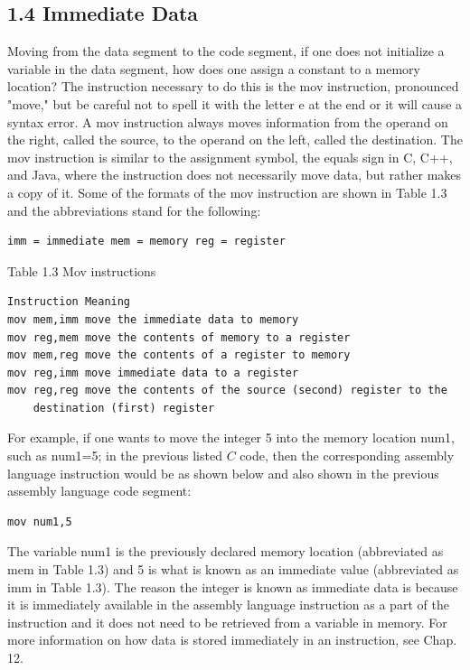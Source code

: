 \documentclass[10pt]{book}
\begin{document}
\subsection*{1.4 Immediate Data}
Moving from the data segment to the code segment, if one does not initialize a variable in the data segment, how does one assign a constant to a memory location? The instruction necessary to do this is the mov instruction, pronounced "move," but be careful not to spell it with the letter e at the end or it will cause a syntax error. A mov instruction always moves information from the operand on the right, called the source, to the operand on the left, called the destination. The mov instruction is similar to the assignment symbol, the equals sign in C, C++, and Java, where the instruction does not necessarily move data, but rather makes a copy of it. Some of the formats of the mov instruction are shown in Table 1.3 and the abbreviations stand for the following:

\begin{verbatim}
imm = immediate mem = memory reg = register
\end{verbatim}

Table 1.3 Mov instructions

\begin{verbatim}
Instruction Meaning
mov mem,imm move the immediate data to memory
mov reg,mem move the contents of memory to a register
mov mem,reg move the contents of a register to memory
mov reg,imm move immediate data to a register
mov reg,reg move the contents of the source (second) register to the
    destination (first) register
\end{verbatim}

For example, if one wants to move the integer 5 into the memory location num1, such as num1=5; in the previous listed $C$ code, then the corresponding assembly language instruction would be as shown below and also shown in the previous assembly language code segment:

\begin{verbatim}
mov num1,5
\end{verbatim}

The variable num1 is the previously declared memory location (abbreviated as mem in Table 1.3) and 5 is what is known as an immediate value (abbreviated as imm in Table 1.3). The reason the integer is known as immediate data is because it is immediately available in the assembly language instruction as a part of the instruction and it does not need to be retrieved from a variable in memory. For more information on how data is stored immediately in an instruction, see Chap. 12.
\end{document}
